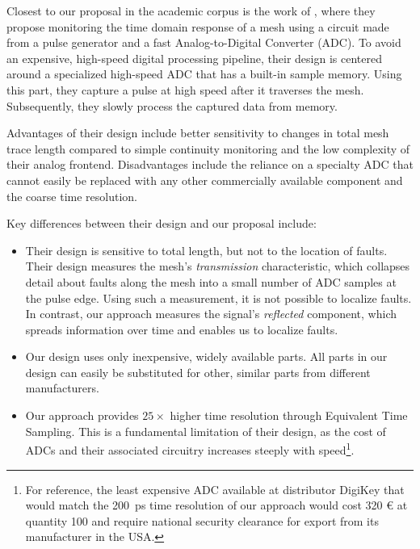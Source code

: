 \documentclass[final]{iacrtrans}
\newcommand{\price}[2]{#1 #2}
\begin{document}
Closest to our proposal in the academic corpus is the work of
\textcite{vasileActiveTamperDetection2017,vasileTemperatureSensitiveActive2017}, where they propose monitoring the time
domain response of a mesh using a circuit made from a pulse generator and a fast Analog-to-Digital Converter (ADC). To
avoid an expensive, high-speed digital processing pipeline, their design is centered around a specialized high-speed ADC
that has a built-in sample memory. Using this part, they capture a pulse at high speed after it traverses the mesh.
Subsequently, they slowly process the captured data from memory.

Advantages of their design include better sensitivity to changes in total mesh trace length compared to simple
continuity monitoring and the low complexity of their analog frontend. Disadvantages include the reliance on a specialty
ADC that cannot easily be replaced with any other commercially available component and the coarse time resolution.

Key differences between their design and our proposal include:
\begin{itemize}
    \item Their design is sensitive to total length, but not to the location of faults. Their design measures the mesh's
        \emph{transmission} characteristic, which collapses detail about faults along the mesh into a small number of
        ADC samples at the pulse edge. Using such a measurement, it is not possible to localize faults. In contrast, our
        approach measures the signal's \emph{reflected} component, which spreads information over time and enables us to
        localize faults.
        
    \item Our design uses only inexpensive, widely available parts. All parts in our design can easily be substituted
        for other, similar parts from different manufacturers.

    \item Our approach provides $25\times$ higher time resolution through Equivalent Time Sampling. This is a
        fundamental limitation of their design, as the cost of ADCs and their associated circuitry increases steeply
        with speed\footnote{ For reference, the least expensive ADC available at distributor DigiKey that would match
        the \qty{200}{\pico\second} time resolution of our approach would cost \price{320}{\euro} at quantity 100 and
        require national security clearance for export from its manufacturer in the USA.}.
\end{itemize}
\end{document}
